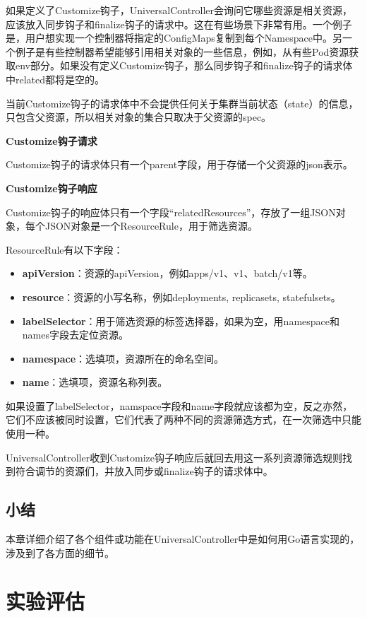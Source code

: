 \documentclass[macfonts,master]{njuthesis}
\begin{document}
如果定义了Customize钩子，UniversalController会询问它哪些资源是相关资源，应该放入同步钩子和finalize钩子的请求中。这在有些场景下非常有用。一个例子是，用户想实现一个控制器将指定的ConfigMaps复制到每个Namespace中。另一个例子是有些控制器希望能够引用相关对象的一些信息，例如，从有些Pod资源获取env部分。如果没有定义Customize钩子，那么同步钩子和finalize钩子的请求体中related都将是空的。

当前Customize钩子的请求体中不会提供任何关于集群当前状态（state）的信息，只包含父资源，所以相关对象的集合只取决于父资源的spec。

\textbf{Customize钩子请求}

Customize钩子的请求体只有一个parent字段，用于存储一个父资源的json表示。

\textbf{Customize钩子响应}

Customize钩子的响应体只有一个字段“relatedResources”，存放了一组JSON对象，每个JSON对象是一个ResourceRule，用于筛选资源。

ResourceRule有以下字段：

\begin{itemize}
	\item \textbf{apiVersion}：资源的apiVersion，例如apps/v1、v1、batch/v1等。
	\item \textbf{resource}：资源的小写名称，例如deployments, replicasets, statefulsets。
	\item \textbf{labelSelector}：用于筛选资源的标签选择器，如果为空，用namespace和names字段去定位资源。
	\item \textbf{namespace}：选填项，资源所在的命名空间。
	\item \textbf{name}：选填项，资源名称列表。
\end{itemize}

如果设置了labelSelector，namspace字段和name字段就应该都为空，反之亦然，它们不应该被同时设置，它们代表了两种不同的资源筛选方式，在一次筛选中只能使用一种。

UniversalController收到Customize钩子响应后就回去用这一系列资源筛选规则找到符合调节的资源们，并放入同步或finalize钩子的请求体中。

\section{小结}
本章详细介绍了各个组件或功能在UniversalController中是如何用Go语言实现的，涉及到了各方面的细节。

\chapter{实验评估}\label{chapter_experiments}
\end{document}
